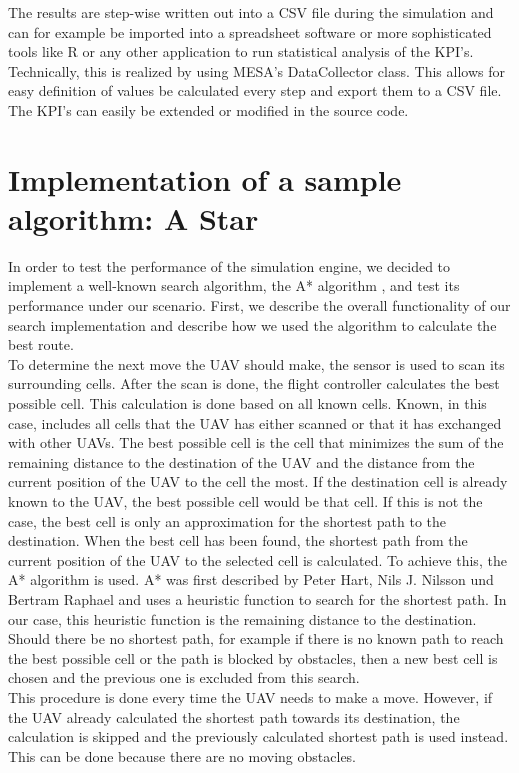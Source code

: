 The results are step-wise written out into a CSV file during the simulation and can for example be imported into a spreadsheet software or more sophisticated tools like R or any other application to run statistical analysis of the KPI's. Technically, this is realized by using MESA's DataCollector class. This allows for easy definition of values be calculated every step and export them to a CSV file. The KPI's can easily be extended or modified in the source code.

\section{Implementation of a sample algorithm: A Star}\label{sec:algorithm}
In order to test the performance of the simulation engine, we decided to implement a well-known search algorithm, the A* algorithm \cite{hart.1968}, and test its performance under our scenario. First, we describe the overall functionality of our search implementation and describe how we used the algorithm to calculate the best route.\\
To determine the next move the UAV should make, the sensor is used to scan its surrounding cells. After the scan is done, the flight controller calculates the best possible cell. This calculation is done based on all known cells. Known, in this case, includes all cells that the UAV has either scanned or that it has exchanged with other UAVs. The best possible cell is the cell that minimizes the sum of the remaining distance to the destination of the UAV and the distance from the current position of the UAV to the cell the most. If the destination cell is already known to the UAV, the best possible cell would be that cell. If this is not the case, the best cell is only an approximation for the shortest path to the destination. When the best cell has been found, the shortest path from the current position of the UAV to the selected cell is calculated. To achieve this, the A* algorithm is used. A* was first described by Peter Hart, Nils J. Nilsson und Bertram Raphael \cite{hart.1968} and uses a heuristic function to search for the shortest path. In our case, this heuristic function is the remaining distance to the destination. Should there be no shortest path, for example if there is no known path to reach the best possible cell or the path is blocked by obstacles, then a new best cell is chosen and the previous one is excluded from this search.\\
This procedure is done every time the UAV needs to make a move. However, if the UAV already calculated the shortest path towards its destination, the calculation is skipped and the previously calculated shortest path is used instead. This can be done because there are no moving obstacles.\\
